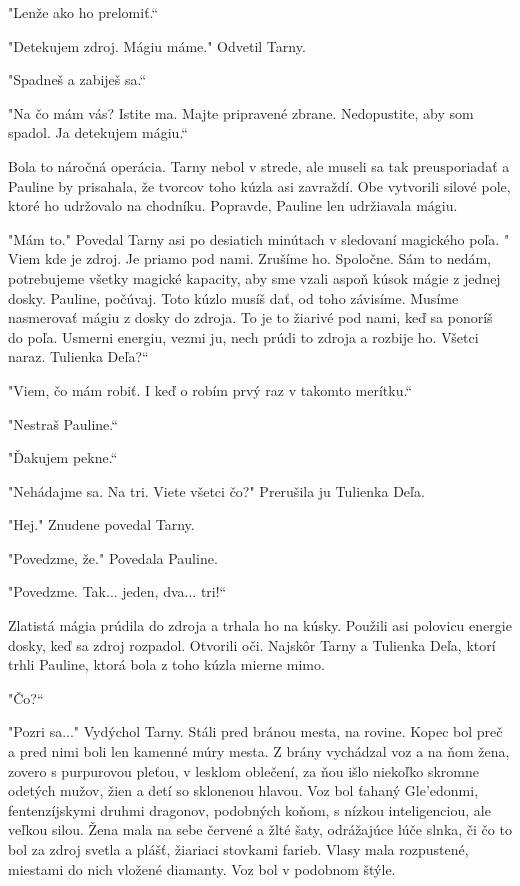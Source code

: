 \documentclass{book}
\begin{document}
"$ $Lenže ako ho prelomiť.“

"$ $Detekujem zdroj. Mágiu máme."$ $ Odvetil Tarny.

"$ $Spadneš a zabiješ sa.“

"$ $Na čo mám vás? Istite ma. Majte pripravené zbrane. Nedopustite, aby som spadol. Ja detekujem mágiu.“

Bola to náročná operácia. Tarny nebol v strede, ale museli sa tak preusporiadať a Pauline by prisahala, že tvorcov toho kúzla asi zavraždí. Obe vytvorili silové pole, ktoré ho udržovalo na chodníku. Popravde, Pauline len udržiavala mágiu.

"$ $Mám to."$ $ Povedal Tarny asi po desiatich minútach v sledovaní magického poľa. "$ $Viem kde je zdroj. Je priamo pod nami. Zrušíme ho. Spoločne. Sám to nedám, potrebujeme všetky magické kapacity, aby sme vzali aspoň kúsok mágie z jednej dosky. Pauline, počúvaj. Toto kúzlo musíš dať, od toho závisíme. Musíme nasmerovať mágiu z dosky do zdroja. To je to žiarivé pod nami, keď sa ponoríš do poľa. Usmerni energiu, vezmi ju, nech prúdi to zdroja a rozbije ho. Všetci naraz. Tulienka Deľa?“

"$ $Viem, čo mám robiť. I keď o robím prvý raz v takomto merítku.“

"$ $Nestraš Pauline.“

"$ $Ďakujem pekne.“

"$ $Nehádajme sa. Na tri. Viete všetci čo?"$ $ Prerušila ju Tulienka Deľa.

"$ $Hej."$ $ Znudene povedal Tarny.

"$ $Povedzme, že."$ $ Povedala Pauline.

"$ $Povedzme. Tak... jeden, dva... tri!“

Zlatistá mágia prúdila do zdroja a trhala ho na kúsky. Použili asi polovicu energie dosky, keď sa zdroj rozpadol. Otvorili oči. Najskôr Tarny a Tulienka Deľa, ktorí trhli Pauline, ktorá bola z toho kúzla mierne mimo.

"$ $Čo?“

"$ $Pozri sa..."$ $ Vydýchol Tarny. Stáli pred bránou mesta, na rovine. Kopec bol preč a pred nimi boli len kamenné múry mesta. Z brány vychádzal voz a na ňom žena, zovero s purpurovou pleťou, v lesklom oblečení, za ňou išlo niekoľko skromne odetých mužov, žien a detí so sklonenou hlavou. Voz bol ťahaný Gle'edonmi, fentenzíjskymi druhmi dragonov, podobných koňom, s nízkou inteligenciou, ale veľkou silou. Žena mala na sebe červené a žlté šaty, odrážajúce lúče slnka, či čo to bol za zdroj svetla a plášť, žiariaci stovkami farieb. Vlasy mala rozpustené, miestami do nich vložené diamanty. Voz bol v podobnom štýle.
\end{document}
